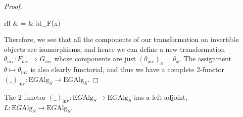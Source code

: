 \documentclass{amsart} %
\newenvironment{eq*}{\begin{equation*}}{\end{equation*}}
\begin{document}
\begin{proof}
\begin{eq*}
\begin{array}{rll}
		& = &  id_{F(x)} \\
		\end{array} 
\end{eq*}
Therefore, we see that all the components of our transformation on invertible objects are isomorphisms, and hence we can define a new transformation $\theta_{\mathrm{inv}}: F_{\mathrm{inv}} \Rightarrow G_{\mathrm{inv}}$ whose components are just $(\theta_{\mathrm{inv}})_x = \theta_x$. The assignment $\theta \mapsto \theta_{\mathrm{inv}}$ is also clearly functorial, and thus we have a complete 2-functor $(\_)_{\mathrm{inv}}: \mathrm{E}G\mathrm{Alg}_S \to \mathrm{E}G\mathrm{Alg}_S$.
\end{proof}

\begin{prop} The 2-functor $(\_)_{\mathrm{inv}}: \mathrm{E}G\mathrm{Alg}_S \to \mathrm{E}G\mathrm{Alg}_S$ has a left adjoint, $L: \mathrm{E}G\mathrm{Alg}_S \to \mathrm{E}G\mathrm{Alg}_S$.
\end{prop}
\end{document}
